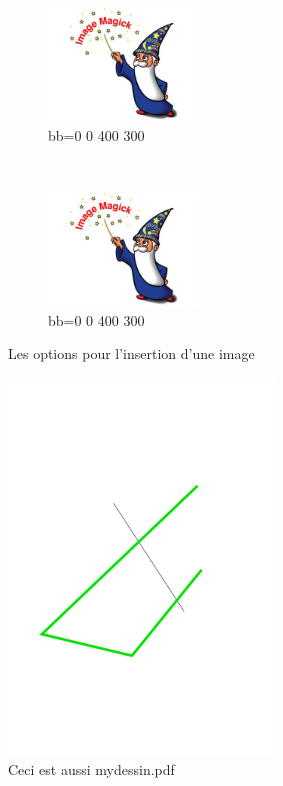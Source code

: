 \documentclass[french]{article}
\begin{document}
\begin{figure}[h]
    ~ %
    \begin{subfigure}[b]{0.3\textwidth}
        \includegraphics[bb=0 0 400 300,height=3cm]{test.jpg}
        \caption{bb=0 0 400 300}
        \label{essai_5}
    \end{subfigure}
    ~
    \begin{subfigure}[b]{0.3\textwidth}
        \includegraphics[bb=0 0 400 300,height=3cm]{test.jpg}
        \caption{bb=0 0 400 300}
        \label{essai_6}
    \end{subfigure}
    \caption{Les options pour l'insertion d'une image}%
    \label{fig:Les options}

\end{figure}




\begin{figure}[!h]
\centering
\includegraphics[width=200pt]{mydessin.pdf}
\caption{Ceci est aussi mydessin.pdf}
\label{mydessin2}
\end{figure}
\end{document}
